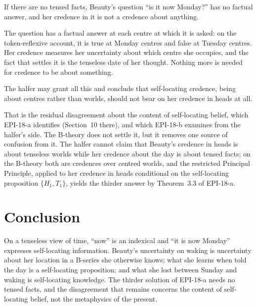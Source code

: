 \documentclass{situationist-preprint}
\begin{document}
\begin{objection}
If there are no tensed facts, Beauty's question \enquote{is it now Monday?} has no factual answer, and her credence in it is not a credence about anything.
\end{objection}

\begin{reply}
The question has a factual answer at each centre at which it is asked: on the token-reflexive account, it is true at Monday centres and false at Tuesday centres. Her credence measures her uncertainty about which centre she occupies, and the fact that settles it is the tenseless date of her thought. Nothing more is needed for credence to be about something.
\end{reply}

\begin{objection}
The halfer may grant all this and conclude that self-locating credence, being about centres rather than worlds, should not bear on her credence in heads at all.
\end{objection}

\begin{reply}
That is the residual disagreement about the content of self-locating belief, which EPI-18-a identifies (Section~10 there), and which EPI-18-b examines from the halfer's side. The B-theory does not settle it, but it removes one source of confusion from it. The halfer cannot claim that Beauty's credence in heads is about tenseless worlds while her credence about the day is about tensed facts; on the B-theory both are credences over centred worlds, and the restricted Principal Principle, applied to her credence in heads conditional on the self-locating proposition $\{H_1, T_1\}$, yields the thirder answer by Theorem~3.3 of EPI-18-a.
\end{reply}

\section{Conclusion}

On a tenseless view of time, \enquote{now} is an indexical and \enquote{it is now Monday} expresses self-locating information. Beauty's uncertainty on waking is uncertainty about her location in a B-series she otherwise knows; what she learns when told the day is a self-locating proposition; and what she lost between Sunday and waking is self-locating knowledge. The thirder solution of EPI-18-a needs no tensed facts, and the disagreement that remains concerns the content of self-locating belief, not the metaphysics of the present.
\end{document}
